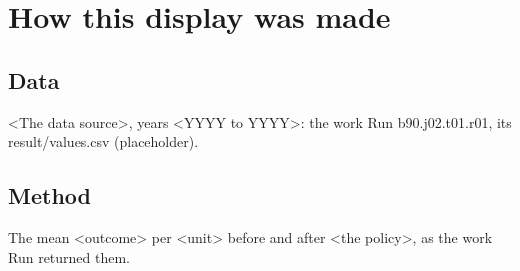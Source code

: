 \documentclass[12pt]{article}
\begin{document}
\makeatletter\renewcommand{\fps@figure}{H}\renewcommand{\fps@table}{H}\makeatother
\renewcommand{\figurename}{Figure}\renewcommand{\tablename}{Table}\renewcommand{\thefigure}{1}\renewcommand{\thetable}{1}

\clearpage
\section*{How this display was made}
\subsection*{Data}
<The data source>, years <YYYY to YYYY>: the work Run b90.j02.t01.r01, its result/values.csv (placeholder).

\subsection*{Method}
The mean <outcome> per <unit> before and after <the policy>, as the work Run returned them.
\end{document}

